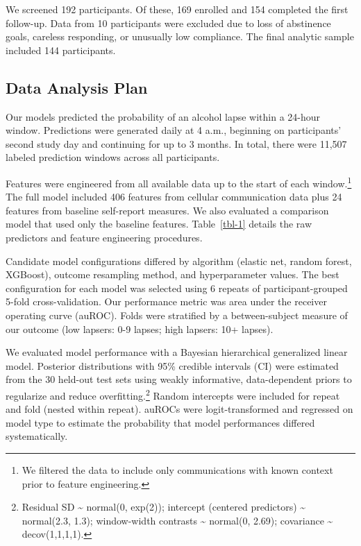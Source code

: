 \documentclass[
  letterpaper,
  DIV=11,
  numbers=noendperiod]{scrartcl}
\begin{document}
We screened 192 participants. Of these, 169 enrolled and 154 completed
the first follow-up. Data from 10 participants were excluded due to loss
of abstinence goals, careless responding, or unusually low compliance.
The final analytic sample included 144 participants.

\subsection{Data Analysis Plan}\label{data-analysis-plan}

Our models predicted the probability of an alcohol lapse within a
24-hour window. Predictions were generated daily at 4 a.m., beginning on
participants' second study day and continuing for up to 3 months. In
total, there were 11,507 labeled prediction windows across all
participants.

Features were engineered from all available data up to the start of each
window.\footnote{We filtered the data to include only communications
  with known context prior to feature engineering.} The full model
included 406 features from cellular communication data plus 24 features
from baseline self-report measures. We also evaluated a comparison model
that used only the baseline features. Table~\ref{tbl-1} details the raw
predictors and feature engineering procedures.

Candidate model configurations differed by algorithm (elastic net,
random forest, XGBoost), outcome resampling method, and hyperparameter
values. The best configuration for each model was selected using 6
repeats of participant-grouped 5-fold cross-validation. Our performance
metric was area under the receiver operating curve (auROC). Folds were
stratified by a between-subject measure of our outcome (low lapsers: 0-9
lapses; high lapsers: 10+ lapses).

We evaluated model performance with a Bayesian hierarchical generalized
linear model. Posterior distributions with 95\% credible intervals (CI)
were estimated from the 30 held-out test sets using weakly informative,
data-dependent priors to regularize and reduce overfitting.\footnote{Residual
  SD \textasciitilde{} normal(0, exp(2)); intercept (centered
  predictors) \textasciitilde{} normal(2.3, 1.3); window-width contrasts
  \textasciitilde{} normal(0, 2.69); covariance \textasciitilde{}
  decov(1,1,1,1).} Random intercepts were included for repeat and fold
(nested within repeat). auROCs were logit-transformed and regressed on
model type to estimate the probability that model performances differed
systematically.
\end{document}
